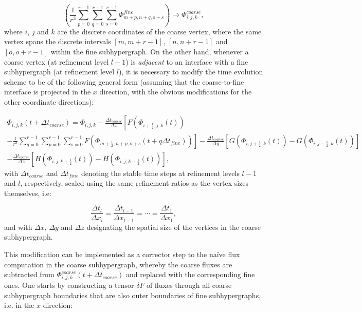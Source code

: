 \documentclass{article}
\begin{document}
\begin{equation}
\left( \frac{1}{r^3} \sum_{p = 0}^{r - 1} \sum_{q = 0}^{r - 1} \sum_{s = 0}^{r - 1} \Phi_{m + p, n + q, o + s}^{fine} \right) \to \Phi_{i, j, k}^{coarse},
\end{equation}
where $i$, $j$ and $k$ are the discrete coordinates of the coarse vertex, where the same vertex spans the discrete intervals ${\left[ m, m + r - 1 \right]}$, ${\left[ n, n + r - 1 \right]}$ and ${\left[ o, o + r - 1 \right]}$ within the fine subhypergraph. On the other hand, whenever a coarse vertex (at refinement level ${l - 1}$) is \textit{adjacent} to an interface with a fine subhypergraph (at refinement level $l$), it is necessary to modify the time evolution scheme to be of the following general form (assuming that the coarse-to-fine interface is projected in the $x$ direction, with the obvious modifications for the other coordinate directions):

\begin{multline}
\Phi_{i, j, k} \left( t + \Delta t_{coarse} \right) = \Phi_{i, j, k} - \frac{\Delta t_{coarse}}{\Delta x} \left[ F \left( \Phi_{i + \frac{1}{2}, j, k} \left( t \right) \right) \right.\\
\left. - \frac{1}{r^3} \sum_{q = 0}^{r - 1} \sum_{p = 0}^{r - 1} \sum_{s = 0}^{r - 1} F \left( \Phi_{m + \frac{1}{2}, n + p, o + s} \left( t + q \Delta t_{fine} \right) \right) \right] - \frac{\Delta t_{coarse}}{\Delta y} \left[ G \left( \Phi_{i, j + \frac{1}{2}, k} \left( t \right) \right) - G \left( \Phi_{i, j - \frac{1}{2}, k} \left( t \right) \right) \right]\\
- \frac{\Delta t_{coarse}}{\Delta z} \left[ H \left( \Phi_{i, j, k + \frac{1}{2}} \left( t \right) \right) - H \left( \Phi_{i, j, k - \frac{1}{2}} \left( t \right) \right) \right],
\end{multline}
with ${\Delta t_{coarse}}$ and ${\Delta t_{fine}}$ denoting the stable time steps at refinement levels ${l - 1}$ and $l$, respectively, scaled using the same refinement ratios as the vertex sizes themselves, i.e:

\begin{equation}
\frac{\Delta t_l}{\Delta x_l} = \frac{\Delta t_{l - 1}}{\Delta x_{l - 1}} = \cdots = \frac{\Delta t_1}{\Delta x_1},
\end{equation}
and with ${\Delta x}$, ${\Delta y}$ and ${\Delta z}$ designating the spatial size of the vertices in the coarse subhypergraph.

This modification can be implemented as a corrector step to the na\"ive flux computation in the coarse subhypergraph, whereby the coarse fluxes are subtracted from ${\Phi_{i, j, k}^{coarse} \left( t + \Delta t_{coarse} \right)}$ and replaced with the corresponding fine ones. One starts by constructing a tensor ${\delta F}$ of fluxes through all coarse subhypergraph boundaries that are also outer boundaries of fine subhypergraphs, i.e. in the $x$ direction:
\end{document}
